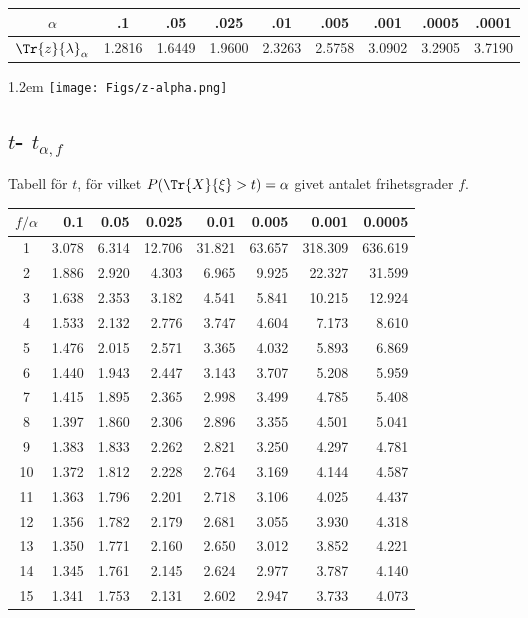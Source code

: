 \documentclass{article}
\def\myskip{\vspace{8pt plus 12pt minus 6pt}}
\begin{document}
{\begin{minipage}[b]{0.69\hsize}
\medskip
\begin{tabular}[h]{c|*{8}{c}}
  $\alpha$ & .1  &  .05  &  .025  &  .01  &  .005  &  .001  &  .0005  &  .0001 \\\hline
  $\Tr{z}{\lambda}_\alpha$ &
  1.2816 & 1.6449 & 1.9600 & 2.3263 & 2.5758 & 3.0902 & 3.2905 & 3.7190 \\
\end{tabular}
\end{minipage}
%
\hfill\lower1.2em
\hbox{\texttt{[image: Figs/z-alpha.png]}}

\myskip

\subsection*{ $t$- $t_{\alpha,f}$}%

   {Tabell för}
   $t$,
      {för vilket}
   $P(\Tr{X}{\xi} > t)=\alpha$
      {givet antalet frihetsgrader}
   $f$.

\medskip
\begin{tabular}{c|*{7}{r}}
$f / \alpha$
    &   0.1  &  0.05  & 0.025  &  0.01  & 0.005  & 0.001  & 0.0005 \\\hline
  1 &  3.078 &  6.314 & 12.706 & 31.821 & 63.657 &318.309 &636.619 \\
  2 &  1.886 &  2.920 &  4.303 &  6.965 &  9.925 & 22.327 & 31.599 \\
  3 &  1.638 &  2.353 &  3.182 &  4.541 &  5.841 & 10.215 & 12.924 \\
  4 &  1.533 &  2.132 &  2.776 &  3.747 &  4.604 &  7.173 &  8.610 \\
  5 &  1.476 &  2.015 &  2.571 &  3.365 &  4.032 &  5.893 &  6.869 \\
  6 &  1.440 &  1.943 &  2.447 &  3.143 &  3.707 &  5.208 &  5.959 \\
  7 &  1.415 &  1.895 &  2.365 &  2.998 &  3.499 &  4.785 &  5.408 \\
  8 &  1.397 &  1.860 &  2.306 &  2.896 &  3.355 &  4.501 &  5.041 \\
  9 &  1.383 &  1.833 &  2.262 &  2.821 &  3.250 &  4.297 &  4.781 \\
 10 &  1.372 &  1.812 &  2.228 &  2.764 &  3.169 &  4.144 &  4.587 \\
 11 &  1.363 &  1.796 &  2.201 &  2.718 &  3.106 &  4.025 &  4.437 \\
 12 &  1.356 &  1.782 &  2.179 &  2.681 &  3.055 &  3.930 &  4.318 \\
 13 &  1.350 &  1.771 &  2.160 &  2.650 &  3.012 &  3.852 &  4.221 \\
 14 &  1.345 &  1.761 &  2.145 &  2.624 &  2.977 &  3.787 &  4.140 \\
 15 &  1.341 &  1.753 &  2.131 &  2.602 &  2.947 &  3.733 &  4.073 \\
\end{tabular}

}
\end{document}
